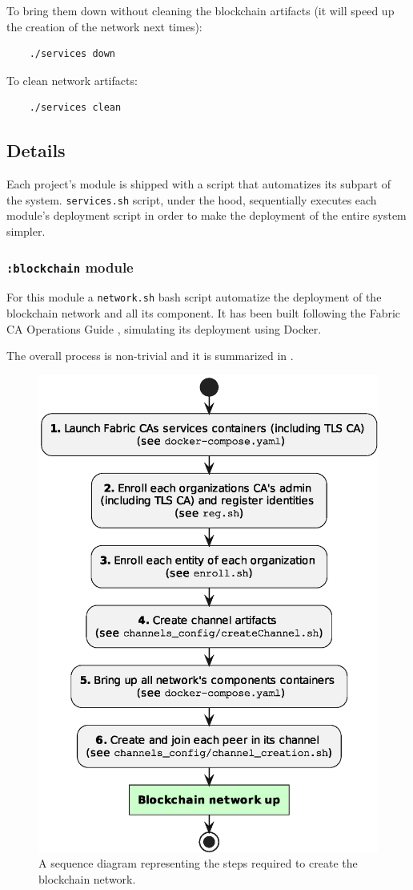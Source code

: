 \documentclass{scrartcl}
\begin{document}
To bring them down without cleaning the blockchain artifacts (it will speed up the creation of the network next times):

\begin{verbatim}
    ./services down
\end{verbatim}

To clean network artifacts:

\begin{verbatim}
    ./services clean
\end{verbatim}

\iffalse

\subsection{Details}
\label{deployment-details}

Each project's module is shipped with a script that automatizes its subpart of the system.
%
\texttt{services.sh} script, under the hood, sequentially executes each module's deployment script in order to make the deployment of the entire system simpler.

\subsubsection*{\texttt{:blockchain} module}

For this module a \texttt{network.sh} bash script automatize the deployment of the blockchain network and all its component.
%
It has been built following the Fabric CA Operations Guide \cite{hyperledger-fabric-ca-docs} \cite{fabric-ca-rework}, simulating its deployment using Docker.

The overall process is non-trivial and it is summarized in .

\begin{figure}
    \centering
    \includegraphics[width=0.6\linewidth]{figures/blockchain-up-sequence.eps}
    \caption{A sequence diagram representing the steps required to create the blockchain network.}
    \label{fig:blockchain-up-sequence}
\end{figure}
\end{document}
